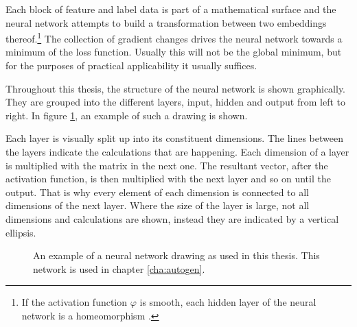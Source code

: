 \documentclass[10pt, a4paper]{UUThesisTemplate}
\begin{document}
Each block of feature and label data is part of a mathematical surface and the neural network attempts to build a transformation between two embeddings thereof.\footnote{If the activation function $\varphi$ is smooth, each hidden layer of the neural network is a homeomorphism \cite{manifold}.} The collection of gradient changes drives the neural network towards a minimum of the loss function. Usually this will not be the global minimum, but for the purposes of practical applicability it usually suffices.

Throughout this thesis, the structure of the neural network is shown graphically. They are grouped into the different layers, input, hidden and output from left to right. In figure \ref{fig:nnexample}, an example of such a drawing is shown.

Each layer is visually split up into its constituent dimensions. The lines between the layers indicate the calculations that are happening. Each dimension of a layer is multiplied with the matrix in the next one. The resultant vector, after the activation function, is then multiplied with the next layer and so on until the output. That is why every element of each dimension is connected to all dimensions of the next layer. Where the size of the layer is large, not all dimensions and calculations are shown, instead they are indicated by a vertical ellipsis.

\begin{figure}
\caption{An example of a neural network drawing as used in this thesis. This network is used in chapter \ref{cha:autogen}.}\label{fig:nnexample}
\end{figure}
\end{document}
